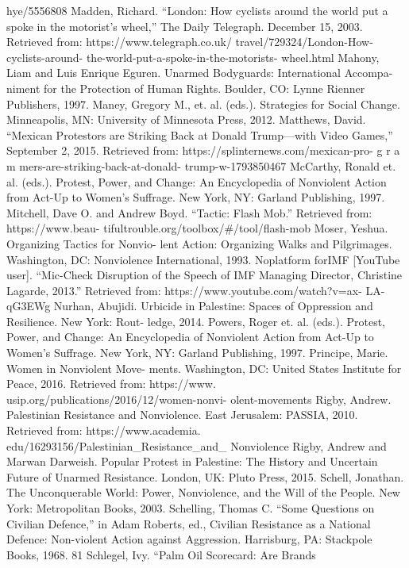 \documentclass[twoside,a4paper,12pt,fleqn,openany]{extbook}
\begin{document}
hye/5556808
Madden, Richard. “London: How cyclists around
the world put a spoke in the motorist’s wheel,”
The Daily Telegraph. December 15, 2003.
Retrieved from: https://www.telegraph.co.uk/
travel/729324/London-How-cyclists-around-
the-world-put-a-spoke-in-the-motorists-
wheel.html
Mahony, Liam and Luis Enrique Eguren.
Unarmed Bodyguards: International Accompa-
niment for the Protection of Human Rights.
Boulder, CO: Lynne Rienner Publishers, 1997.
Maney, Gregory M., et. al. (eds.). Strategies for
Social Change. Minneapolis, MN: University of
Minnesota Press, 2012.
Matthews, David. “Mexican Protestors are
Striking Back at Donald Trump—with Video
Games,” September 2, 2015. Retrieved from:
https://splinternews.com/mexican-pro-
g r a m mers-are-striking-back-at-donald-
trump-w-1793850467
McCarthy, Ronald et. al. (eds.). Protest, Power,
and Change: An Encyclopedia of Nonviolent
Action from Act-Up to Women’s Suffrage. New
York, NY: Garland Publishing, 1997.
Mitchell, Dave O. and Andrew Boyd. “Tactic:
Flash Mob.” Retrieved from: https://www.beau-
tifultrouble.org/toolbox/#/tool/flash-mob
Moser, Yeshua. Organizing Tactics for Nonvio-
lent Action: Organizing Walks and Pilgrimages.
Washington, DC: Nonviolence International,
1993.
Noplatform forIMF [YouTube user]. “Mic-Check
Disruption of the Speech of IMF Managing
Director, Christine Lagarde, 2013.” Retrieved
from: https://www.youtube.com/watch?v=ax-
LA-qG3EWg
Nurhan, Abujidi. Urbicide in Palestine: Spaces
of Oppression and Resilience. New York: Rout-
ledge, 2014.
Powers, Roger et. al. (eds.). Protest, Power, and
Change: An Encyclopedia of Nonviolent Action
from Act-Up to Women’s Suffrage. New York,
NY: Garland Publishing, 1997.
Principe, Marie. Women in Nonviolent Move-
ments. Washington, DC: United States Institute
for Peace, 2016. Retrieved from: https://www.
usip.org/publications/2016/12/women-nonvi-
olent-movements
Rigby, Andrew. Palestinian Resistance and
Nonviolence. East Jerusalem: PASSIA, 2010.
Retrieved from: https://www.academia.
edu/16293156/Palestinian_Resistance_and_
Nonviolence
Rigby, Andrew and Marwan Darweish. Popular
Protest in Palestine: The History and Uncertain
Future of Unarmed Resistance. London, UK:
Pluto Press, 2015.
Schell, Jonathan. The Unconquerable World:
Power, Nonviolence, and the Will of the People.
New York: Metropolitan Books, 2003.
Schelling, Thomas C. “Some Questions on
Civilian Defence,” in Adam Roberts, ed., Civilian
Resistance as a National Defence: Non-violent
Action against Aggression. Harrisburg, PA:
Stackpole Books, 1968.
81
Schlegel, Ivy. “Palm Oil Scorecard: Are Brands
\end{document}

